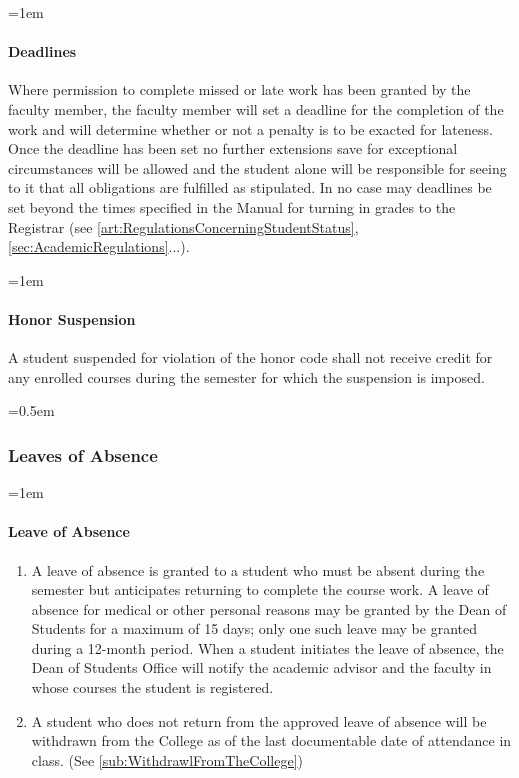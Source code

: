 \documentclass{manual}
\newcommand{\modified}[1]{}
\let\oldsubsubsection\subsubsection
\renewcommand\subsubsection{\leftskip=0.5em\oldsubsubsection}
\let\oldparagraph\paragraph
\renewcommand\paragraph{\leftskip=1em\oldparagraph}
\begin{document}
\paragraph{Deadlines}
Where permission to complete missed or late work has been granted by the faculty member, the faculty member will set a deadline for the completion of the work and will determine whether or not a penalty is to be exacted for lateness. Once the deadline has been set no further extensions save for exceptional circumstances will be allowed and the student alone will be responsible for seeing to it that all obligations are fulfilled as stipulated. In no case may deadlines be set beyond the times specified in the Manual for turning in grades to the Registrar (see \cref{art:RegulationsConcerningStudentStatus}, \cref{sec:AcademicRegulations}...).

\paragraph{Honor Suspension}
A student suspended for violation of the honor code shall not receive credit for any enrolled courses during the semester for which the suspension is imposed.

\subsubsection{Leaves of Absence}

\paragraph{Leave of Absence} \modified{5/9/95}

\begin{enumerate}[label=\alph*)]
\item A leave of absence is granted to a student who must be absent during the semester but anticipates returning to complete the course work. A leave of absence for medical or other personal reasons may be granted by the Dean of Students for a maximum of 15 days; only one such leave may be granted during a 12-month period. When a student initiates the leave of absence, the Dean of Students Office will notify the academic advisor and the faculty in whose courses the student is registered.
\item A student who does not return from the approved leave of absence will be withdrawn from the College as of the last documentable date of attendance in class. (See \cref{sub:WithdrawlFromTheCollege})
\end{enumerate}
\end{document}
